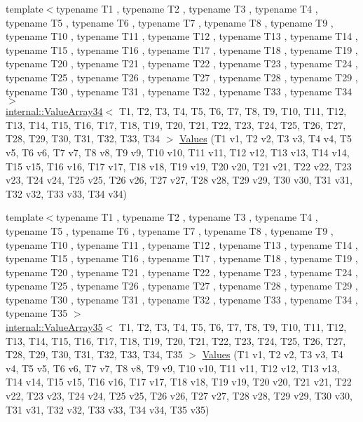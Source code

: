 \begin{DoxyCompactItemize}
{\footnotesize template$<$typename T1 , typename T2 , typename T3 , typename T4 , typename T5 , typename T6 , typename T7 , typename T8 , typename T9 , typename T10 , typename T11 , typename T12 , typename T13 , typename T14 , typename T15 , typename T16 , typename T17 , typename T18 , typename T19 , typename T20 , typename T21 , typename T22 , typename T23 , typename T24 , typename T25 , typename T26 , typename T27 , typename T28 , typename T29 , typename T30 , typename T31 , typename T32 , typename T33 , typename T34 $>$ }\\\mbox{\hyperlink{classtesting_1_1internal_1_1_value_array34}{internal\+::\+Value\+Array34}}$<$ T1, T2, T3, T4, T5, T6, T7, T8, T9, T10, T11, T12, T13, T14, T15, T16, T17, T18, T19, T20, T21, T22, T23, T24, T25, T26, T27, T28, T29, T30, T31, T32, T33, T34 $>$ \mbox{\hyperlink{namespacetesting_a37ae9a0b15ed1e02fda22769ef76c97e}{Values}} (T1 v1, T2 v2, T3 v3, T4 v4, T5 v5, T6 v6, T7 v7, T8 v8, T9 v9, T10 v10, T11 v11, T12 v12, T13 v13, T14 v14, T15 v15, T16 v16, T17 v17, T18 v18, T19 v19, T20 v20, T21 v21, T22 v22, T23 v23, T24 v24, T25 v25, T26 v26, T27 v27, T28 v28, T29 v29, T30 v30, T31 v31, T32 v32, T33 v33, T34 v34)
\item 
{\footnotesize template$<$typename T1 , typename T2 , typename T3 , typename T4 , typename T5 , typename T6 , typename T7 , typename T8 , typename T9 , typename T10 , typename T11 , typename T12 , typename T13 , typename T14 , typename T15 , typename T16 , typename T17 , typename T18 , typename T19 , typename T20 , typename T21 , typename T22 , typename T23 , typename T24 , typename T25 , typename T26 , typename T27 , typename T28 , typename T29 , typename T30 , typename T31 , typename T32 , typename T33 , typename T34 , typename T35 $>$ }\\\mbox{\hyperlink{classtesting_1_1internal_1_1_value_array35}{internal\+::\+Value\+Array35}}$<$ T1, T2, T3, T4, T5, T6, T7, T8, T9, T10, T11, T12, T13, T14, T15, T16, T17, T18, T19, T20, T21, T22, T23, T24, T25, T26, T27, T28, T29, T30, T31, T32, T33, T34, T35 $>$ \mbox{\hyperlink{namespacetesting_a8746425c9d27e46ea5bc5fd77586bc2a}{Values}} (T1 v1, T2 v2, T3 v3, T4 v4, T5 v5, T6 v6, T7 v7, T8 v8, T9 v9, T10 v10, T11 v11, T12 v12, T13 v13, T14 v14, T15 v15, T16 v16, T17 v17, T18 v18, T19 v19, T20 v20, T21 v21, T22 v22, T23 v23, T24 v24, T25 v25, T26 v26, T27 v27, T28 v28, T29 v29, T30 v30, T31 v31, T32 v32, T33 v33, T34 v34, T35 v35)
\item 

\end{DoxyCompactItemize}
